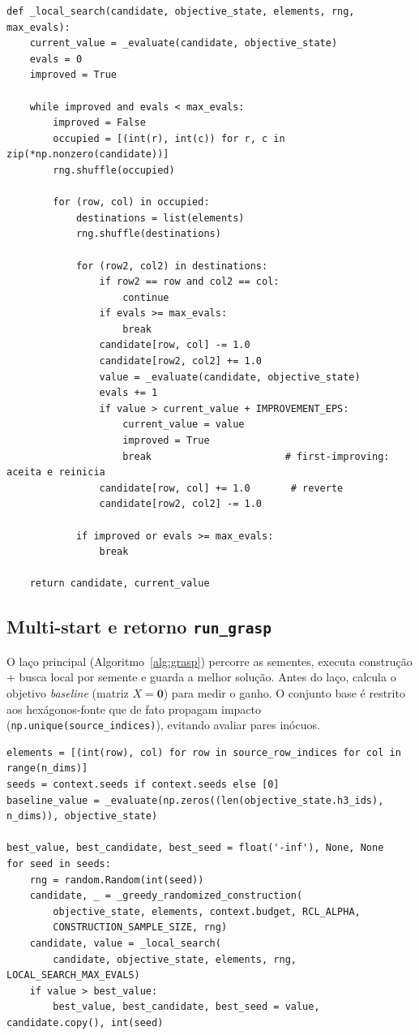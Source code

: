 \documentclass[11pt,a4paper]{article}
\begin{document}
\begin{lstlisting}[style=py,caption={Busca local first-improving por movimento de POI.}]
def _local_search(candidate, objective_state, elements, rng, max_evals):
    current_value = _evaluate(candidate, objective_state)
    evals = 0
    improved = True

    while improved and evals < max_evals:
        improved = False
        occupied = [(int(r), int(c)) for r, c in zip(*np.nonzero(candidate))]
        rng.shuffle(occupied)

        for (row, col) in occupied:
            destinations = list(elements)
            rng.shuffle(destinations)

            for (row2, col2) in destinations:
                if row2 == row and col2 == col:
                    continue
                if evals >= max_evals:
                    break
                candidate[row, col] -= 1.0
                candidate[row2, col2] += 1.0
                value = _evaluate(candidate, objective_state)
                evals += 1
                if value > current_value + IMPROVEMENT_EPS:
                    current_value = value
                    improved = True
                    break                       # first-improving: aceita e reinicia
                candidate[row, col] += 1.0       # reverte
                candidate[row2, col2] -= 1.0

            if improved or evals >= max_evals:
                break

    return candidate, current_value
\end{lstlisting}

\subsection{Multi-start e retorno \texttt{run\_grasp}}

O laço principal (Algoritmo~\ref{alg:grasp}) percorre as sementes, executa
construção + busca local por semente e guarda a melhor solução. Antes do laço,
calcula o objetivo \emph{baseline} (matriz $X=\mathbf 0$) para medir o ganho.
O conjunto base é restrito aos hexágonos-fonte que de fato propagam impacto
(\texttt{np.unique(source\_indices)}), evitando avaliar pares inócuos.

\begin{lstlisting}[style=py,caption={Laço multi-start e montagem do resultado (trecho central).}]
elements = [(int(row), col) for row in source_row_indices for col in range(n_dims)]
seeds = context.seeds if context.seeds else [0]
baseline_value = _evaluate(np.zeros((len(objective_state.h3_ids), n_dims)), objective_state)

best_value, best_candidate, best_seed = float('-inf'), None, None
for seed in seeds:
    rng = random.Random(int(seed))
    candidate, _ = _greedy_randomized_construction(
        objective_state, elements, context.budget, RCL_ALPHA,
        CONSTRUCTION_SAMPLE_SIZE, rng)
    candidate, value = _local_search(
        candidate, objective_state, elements, rng, LOCAL_SEARCH_MAX_EVALS)
    if value > best_value:
        best_value, best_candidate, best_seed = value, candidate.copy(), int(seed)
\end{lstlisting}
\end{document}
